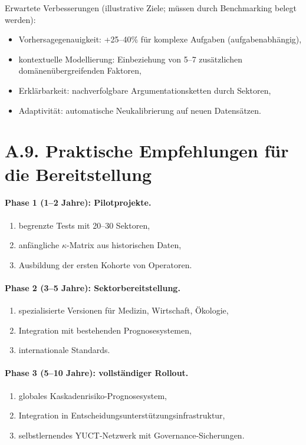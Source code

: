 \documentclass[13pt,a4paper]{article}
\begin{document}
	Erwartete Verbesserungen (illustrative Ziele; müssen durch Benchmarking belegt werden):
	\begin{itemize}[leftmargin=*]
		\item Vorhersagegenauigkeit: +25--40\% für komplexe Aufgaben (aufgabenabhängig),
		\item kontextuelle Modellierung: Einbeziehung von 5--7 zusätzlichen domänenübergreifenden Faktoren,
		\item Erklärbarkeit: nachverfolgbare Argumentationsketten durch Sektoren,
		\item Adaptivität: automatische Neukalibrierung auf neuen Datensätzen.
	\end{itemize}
	
	\section*{A.9. Praktische Empfehlungen für die Bereitstellung}
	
	\paragraph{Phase 1 (1--2 Jahre): Pilotprojekte.}
	\begin{enumerate}[leftmargin=*]
		\item begrenzte Tests mit 20--30 Sektoren,
		\item anfängliche $\kappa$-Matrix aus historischen Daten,
		\item Ausbildung der ersten Kohorte von Operatoren.
	\end{enumerate}
	
	\paragraph{Phase 2 (3--5 Jahre): Sektorbereitstellung.}
	\begin{enumerate}[leftmargin=*]
		\item spezialisierte Versionen für Medizin, Wirtschaft, Ökologie,
		\item Integration mit bestehenden Prognosesystemen,
		\item internationale Standards.
	\end{enumerate}
	
	\paragraph{Phase 3 (5--10 Jahre): vollständiger Rollout.}
	\begin{enumerate}[leftmargin=*]
		\item globales Kaskadenrisiko-Prognosesystem,
		\item Integration in Entscheidungsunterstützungsinfrastruktur,
		\item selbstlernendes YUCT-Netzwerk mit Governance-Sicherungen.
	\end{enumerate}
	
\end{document}

